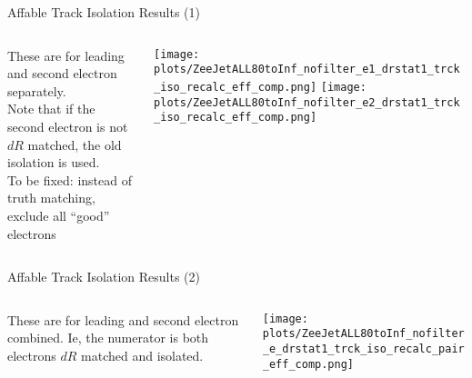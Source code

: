 \documentclass{beamer}
\begin{document}
\begin{frame}{Affable Track Isolation Results (1)}
  \begin{columns}%
    \begin{column}{0.3\textwidth}
      These are for leading and second electron separately.\\ \bigskip Note that if the second electron is not $dR$ matched, the old isolation is used. \\ \bigskip To be fixed: instead of truth matching, exclude all ``good'' electrons
    \end{column}

    \begin{column}{0.6\textwidth}
      \texttt{[image: plots/ZeeJetALL80toInf\_nofilter\_e1\_drstat1\_trck\_iso\_recalc\_eff\_comp.png]}
      \vspace{-0.2cm}
      \texttt{[image: plots/ZeeJetALL80toInf\_nofilter\_e2\_drstat1\_trck\_iso\_recalc\_eff\_comp.png]}

    \end{column}
  \end{columns}
\end{frame}


\begin{frame}{Affable Track Isolation Results (2)}
  \begin{columns}%
    \begin{column}{0.35\textwidth}
      These are for leading and second electron combined. Ie, the numerator is both electrons $dR$ matched and isolated.
    \end{column}

    \begin{column}{0.6\textwidth}
      \texttt{[image: plots/ZeeJetALL80toInf\_nofilter\_e\_drstat1\_trck\_iso\_recalc\_pair\_eff\_comp.png]}
    \end{column}
  \end{columns}
\end{frame}
\end{document}
